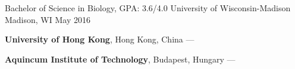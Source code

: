 
\begin{cventries}
  \cventry
    {Bachelor of Science in Biology, GPA: 3.6/4.0} %
    {University of Wisconsin-Madison} %
    {Madison, WI} %
    {May 2016} %
    {
      \begin{cvitems} %
         \item {\textbf{University of Hong Kong}, Hong Kong, China --- }
         \vspace{0.5mm}
         \item {\textbf{Aquincum Institute of Technology}, Budapest, Hungary --- }
      \end{cvitems}
    }
\end{cventries}
